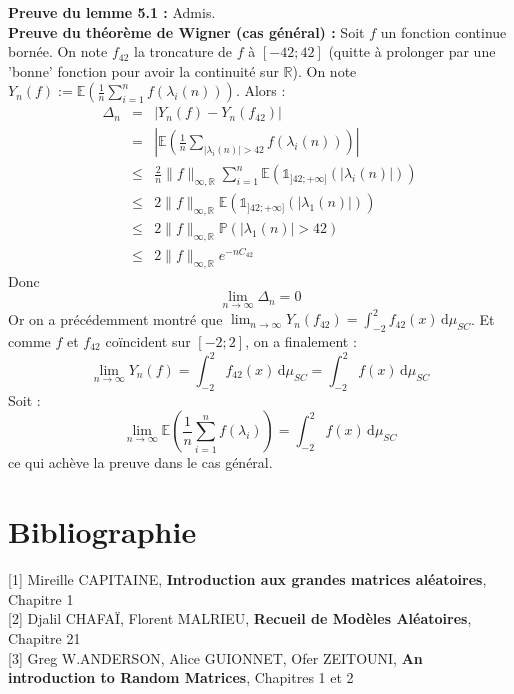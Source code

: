 \documentclass[10pt,a4paper]{article}
\begin{document}
\textbf{Preuve du lemme 5.1 :} Admis.\\

\textbf{Preuve du théorème de Wigner (cas général) :} Soit $f$ un fonction continue bornée. On note $f_{42}$ la troncature de $f$ à $[-42;42]$ (quitte à prolonger par une 'bonne' fonction pour avoir la continuité sur $\mathbb{R}$). On note $Y_n(f) := \mathbb{E}\left (\frac{1}{n} \sum_{i=1}^n f(\lambda_i(n))\right ) $. Alors :
\begin{eqnarray*}
\Delta_n &=&|Y_n(f)-Y_n(f_{42})| \\
&=& | \mathbb{E}\left (\frac{1}{n} \sum_{|\lambda_i(n)| > 42} f(\lambda_i(n))\right ) | \\
&\leq& \frac{2}{n}\|f\|_{\infty,\mathbb{R}} \sum_{i=1}^n \mathbb{E}(\mathds{1}_{]42; + \infty]}(|\lambda_i(n)|))\\
&\leq& 2\|f\|_{\infty,\mathbb{R}} \mathbb{E}(\mathds{1}_{]42; + \infty]}(|\lambda_1(n)|)) \\
&\leq& 2\|f\|_{\infty,\mathbb{R}} \mathbb{P}(|\lambda_1(n)| > 42) \\
&\leq& 2\|f\|_{\infty,\mathbb{R}}e^{-nC_{42}}  \end{eqnarray*}
Donc \[\lim_{n \to \infty} \Delta_n = 0\] Or on a précédemment montré que $\lim_{n \to \infty} Y_n(f_{42}) =\int_{-2}^2 f_{42}(x) \, \mathrm{d}\mu_{SC}$. Et comme $f$ et $f_{42}$ coïncident sur $[-2;2]$, on a finalement : \[\lim_{n \to \infty} Y_n(f) = \int_{-2}^2 f_{42}(x) \, \mathrm{d}\mu_{SC} = \int_{-2}^2 f(x) \, \mathrm{d}\mu_{SC}\] Soit : \[\lim_{n \to \infty} \mathbb{E}\left (\frac{1}{n} \sum_{i=1}^n f(\lambda_i)\right ) = \int_{-2}^2 f(x) \, \mathrm{d}\mu_{SC}\] ce qui achève la preuve dans le cas général.\\


\section{Bibliographie \\}

[1] Mireille CAPITAINE,\textbf{ Introduction aux grandes matrices aléatoires}, 	Chapitre 1\\

[2] Djalil CHAFAÏ, Florent MALRIEU, \textbf{ Recueil de Modèles Aléatoires}, Chapitre 21\\

[3] Greg W.ANDERSON, Alice GUIONNET, Ofer ZEITOUNI, \textbf{ An introduction to Random Matrices}, Chapitres 1 et 2
\end{document}
